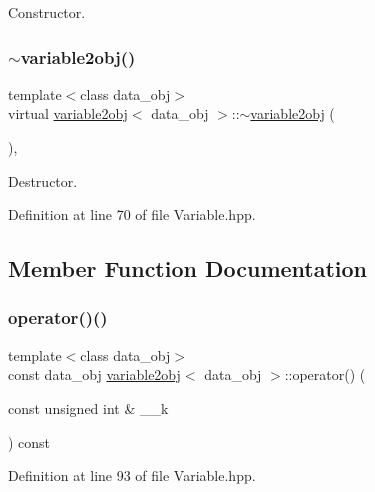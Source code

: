 Constructor. 

\mbox{\label{structvariable2obj_aa0f1e05028c5db51677151a9bf71ab87}} 
\subsubsection{\texorpdfstring{$\sim$variable2obj()}{~variable2obj()}}
{\footnotesize\ttfamily template$<$class data\+\_\+obj$>$ \\
virtual \hyperlink{structvariable2obj}{variable2obj}$<$ data\+\_\+obj $>$\+::$\sim$\hyperlink{structvariable2obj}{variable2obj} (\begin{DoxyParamCaption}{ }\end{DoxyParamCaption})\hspace{0.3cm}{\ttfamily [inline]}, {\ttfamily [virtual]}}



Destructor. 



Definition at line 70 of file Variable.\+hpp.



\subsection{Member Function Documentation}
\mbox{\label{structvariable2obj_a684730ba2c695c0d41d8a0b6405f4227}} 
\subsubsection{\texorpdfstring{operator()()}{operator()()}}
{\footnotesize\ttfamily template$<$class data\+\_\+obj$>$ \\
const data\+\_\+obj \hyperlink{structvariable2obj}{variable2obj}$<$ data\+\_\+obj $>$\+::operator() (\begin{DoxyParamCaption}\item[{const unsigned int \&}]{\+\_\+\+\_\+k }\end{DoxyParamCaption}) const\hspace{0.3cm}{\ttfamily [inline]}}



Definition at line 93 of file Variable.\+hpp.


